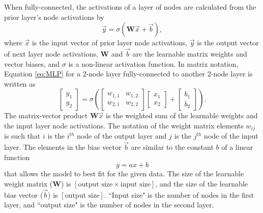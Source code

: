When fully-connected, the activations of a layer of nodes are calculated from the prior layer's node activations by
\begin{equation} \label{eq:MLP}
	\vec{y} = \sigma \left(\textbf{W}\vec{x} + \vec{b}\right),
\end{equation}
where $\vec{x}$ is the input vector of prior layer node activations, $\vec{y}$ is the output vector of next layer node activations, $\textbf{W}$ and $\vec{b}$ are the learnable matrix weights and vector biases, and $\sigma$ is a non-linear activation function. In matrix notation, Equation \ref{eq:MLP} for a 2-node layer fully-connected to another 2-node layer is written as
\begin{equation} \label{eq:MLP_matrix}
	\begin{bmatrix}
		y_{1} \\
		y_{2}
	\end{bmatrix}
	= \sigma \left(
	\begin{bmatrix}
		w_{1,1} & w_{1,2} \\
		w_{2,1} & w_{2,2}
	\end{bmatrix}
	\begin{bmatrix}
		x_{1} \\
		x_{2}
	\end{bmatrix}
	+
	\begin{bmatrix}
		b_{1} \\
		b_{2}
	\end{bmatrix}
	\right).
\end{equation}
The matrix-vector product $\textbf{W}\vec{x}$ is the weighted sum of the learnable weights and the input layer node activations. The notation of the weight matrix elements $w_{ij}$ is such that $i$ is the $i^{th}$ node of the output layer and $j$ is the $j^{th}$ node of the input layer. The elements in the bias vector $\vec{b}$ are similar to the constant $b$ of a linear function
\[
y = ax + b
\]
that allows the model to best fit for the given data. The size of the learnable weight matrix ($\textbf{W}$) is $\left[\text{output size} \times \text{input size}\right]$, and the size of the learnable bias vector ($\vec{b}$) is $\left[\text{output size}\right]$. ``Input size" is the number of nodes in the first layer, and ``output size" is the number of nodes in the second layer.

